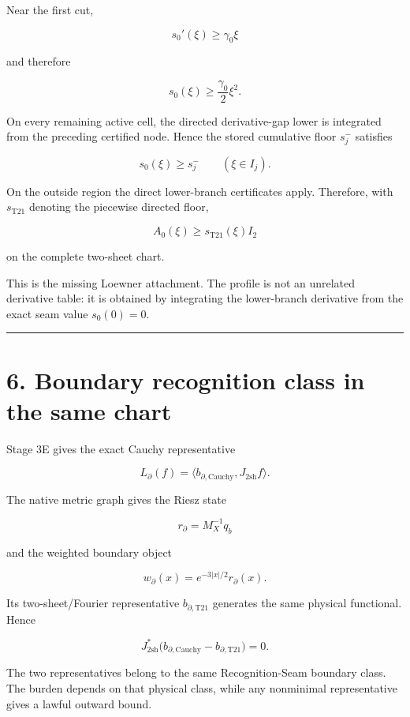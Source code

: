 Near the first cut,

\[
s_0'(\xi)\ge\gamma_0\xi
\]

and therefore

\[
\boxed{
s_0(\xi)\ge\frac{\gamma_0}{2}\xi^2.
}
\tag{5.1}
\]

On every remaining active cell, the directed derivative-gap lower is integrated
from the preceding certified node. Hence the stored cumulative floor
\(s_j^-\) satisfies

\[
s_0(\xi)\ge s_j^-
\qquad(\xi\in I_j).
\]

On the outside region the direct lower-branch certificates apply. Therefore,
with \(s_{\mathrm{T21}}\) denoting the piecewise directed floor,

\[
\boxed{
A_0(\xi)\ge s_{\mathrm{T21}}(\xi)I_2
}
\tag{5.2}
\]

on the complete two-sheet chart.

This is the missing Loewner attachment. The profile is not an unrelated
derivative table: it is obtained by integrating the lower-branch derivative
from the exact seam value \(s_0(0)=0\).

\begin{center}\rule{0.5\linewidth}{0.5pt}\end{center}

\hypertarget{boundary-recognition-class-in-the-same-chart}{%
\section{6. Boundary recognition class in the same chart}\label{boundary-recognition-class-in-the-same-chart}}

Stage 3E gives the exact Cauchy representative

\[
L_\partial(f)
=
\langle b_{\partial,\mathrm{Cauchy}},
J_{\mathrm{2sh}}f\rangle.
\]

The native metric graph gives the Riesz state

\[
r_\partial=M_X^{-1}q_b
\]

and the weighted boundary object

\[
w_\partial(x)=e^{-3|x|/2}r_\partial(x).
\]

Its two-sheet/Fourier representative
\(b_{\partial,\mathrm{T21}}\) generates the same physical functional. Hence

\[
\boxed{
J_{\mathrm{2sh}}^*
\bigl(
b_{\partial,\mathrm{Cauchy}}
-
b_{\partial,\mathrm{T21}}
\bigr)
=0.
}
\tag{6.1}
\]

The two representatives belong to the same Recognition-Seam boundary class.
The burden depends on that physical class, while any nonminimal representative
gives a lawful outward bound.

